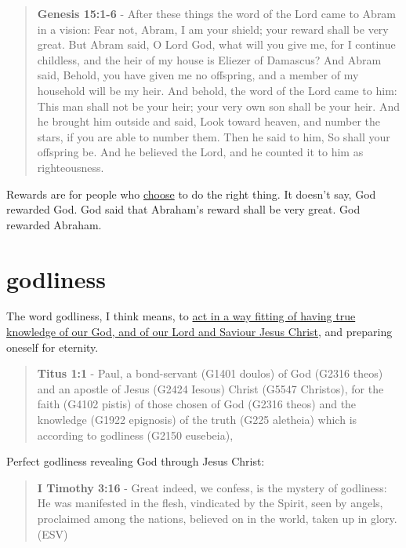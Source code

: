 \documentclass[11pt]{article}
\begin{document}
\begin{quote}
\textbf{Genesis 15:1-6} - After these things the word of the Lord came to Abram in a vision: Fear not, Abram, I am your shield; your reward shall be very great. But Abram said, O Lord God, what will you give me, for I continue childless, and the heir of my house is Eliezer of Damascus? And Abram said, Behold, you have given me no offspring, and a member of my household will be my heir. And behold, the word of the Lord came to him: This man shall not be your heir; your very own son shall be your heir. And he brought him outside and said, Look toward heaven, and number the stars, if you are able to number them. Then he said to him, So shall your offspring be. And he believed the Lord, and he counted it to him as righteousness.
\end{quote}

Rewards are for people who \uline{choose} to do the right thing.
It doesn't say, God rewarded God. God said that Abraham's reward shall be very great. God rewarded Abraham.

\section{godliness}
\label{sec:orge266a7f}
The word godliness, I think means, to \uline{act in a way fitting of having true knowledge of our God, and of our Lord and Saviour Jesus Christ}, and preparing oneself for eternity.

\begin{quote}
\textbf{Titus 1:1} - Paul, a bond-servant (G1401 doulos) of God (G2316 theos) and an apostle of Jesus (G2424 Iesous) Christ (G5547 Christos), for the faith (G4102 pistis) of those chosen of God (G2316 theos) and the knowledge (G1922 epignosis) of the truth (G225 aletheia) which is according to godliness (G2150 eusebeia),
\end{quote}

Perfect godliness revealing God through Jesus Christ:

\begin{quote}
\textbf{I Timothy 3:16} - Great indeed, we confess, is the mystery of godliness: He was manifested in the flesh, vindicated by the Spirit, seen by angels, proclaimed among the nations, believed on in the world, taken up in glory. (ESV)
\end{quote}
\end{document}
